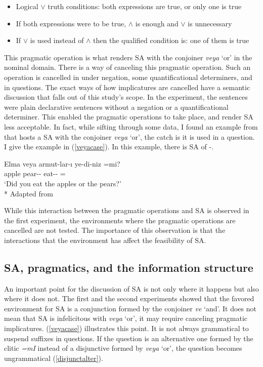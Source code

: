 \begin{itemize}
    \item Logical $\vee$ truth conditions: both expressions are true, or only one is true
    \item If both expressions were to be true, $\wedge$ is enough and $\vee$ is unnecessary
    \item If $\vee$ is used instead of $\wedge$ then the qualified condition is: one of them is true
\end{itemize}

This pragmatic operation is what renders {\Case} SA with the conjoiner \textit{veya} `or' in the nominal domain. There is a way of canceling this pragmatic operation. Such an operation is cancelled in under negation, some quantificational determiners, and in questions. The exact ways of how implicatures are cancelled have a semantic discussion that falls out of this study's scope. In the experiment, the sentences were plain declarative sentences without a negation or a quantificational determiner. This enabled the pragmatic operations to take place, and render {\Case} SA less acceptable. In fact, while sifting through some data, I found an example from \cite[p.24]{johannessen1998coordination} that hosts a {\Case} SA with the conjoiner \textit{veya} `or', the catch is it is used in a question. I give the example in (\ref{veyacase}). In this example, there is SA of {\Pl-\Case}.

\begin{exe}
    \ex \label{veyacase} 
    \gll Elma veya armut-lar-ı ye-di-niz =mi? \\ 
    apple {\Or} pear-{\Pl}-{\Acc} eat-{\Pst}-{\Spl} ={\Q} \\
    \glt `Did you eat the apples or the pears?' \\*
    \hfill Adapted from \citet{johannessen1998coordination}
\end{exe}

While this interaction between the pragmatic operations and {\Case} SA is observed in the first experiment, the environments where the pragmatic operations are cancelled are not tested. The importance of this observation is that the interactions that the environment has affect the feasibility of SA.


\subsection{SA, pragmatics, and the information structure}

An important point for the discussion of SA is not only where it happens but also where it does not. The first and the second experiments showed that the favored environment for SA is a conjunction formed by the conjoiner \textit{ve} `and'. It does not mean that SA is infelicitous with \textit{veya} `or', it may require canceling pragmatic implicatures. (\ref{veyacase}) illustrates this point. It is not always grammatical to suspend suffixes in questions. If the question is an alternative one formed by the clitic \textit{=mI} instead of a disjunctive formed by \textit{veya} `or', the question becomes ungrammatical (\ref{disjunctalter}).

